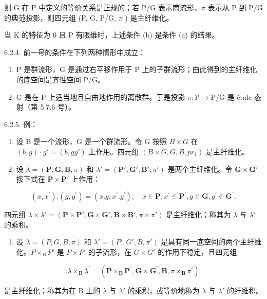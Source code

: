 则 G 在 P 中定义的等价关系是正规的；若 P/G 表示商流形，\(\pi\) 表示从 P 到 P/G 的典范投影，则四元组 (P, G, P/G, \(\pi\) ) 是主纤维化。

当 K 的特征为 0 且 P 有限维时，上述条件 (b) 是条件 (a) 的结果。

6.2.4. 前一号的条件在下列两种情形中成立：

\begin{enumerate}
\def\labelenumi{(\alph{enumi})}
\item
  P 是群流形，G 是通过右平移作用于 P 上的子群流形；由此得到的主纤维化的底空间是齐性空间 P/G。
\item
  G 是在 P 上适当地且自由地作用的离散群。于是投影 \(\pi: \mathrm{P} \to \mathrm{P} / \mathrm{G}\) 是 étale 态射（第 5.7.6 号）。
\end{enumerate}

6.2.5. 例：

\begin{enumerate}
\def\labelenumi{(\alph{enumi})}
\item
  设 B 是一个流形，G 是一个群流形。令 G 按照 \(B \times G\) 在 \((b, g) \cdot g' = (b, gg')\) 上作用。四元组 \((B \times G, G, B, pr_{1})\) 是主纤维化。
\item
  设 \(\lambda = (\mathbf{P}, \mathbf{G}, \mathbf{B}, \pi)\) 和 \(\lambda' = (\mathbf{P}', \mathbf{G}', \mathbf{B}', \pi')\) 是两个主纤维化。令 \(\mathbf{G} \times \mathbf{G}'\) 按下式在 \(\mathbf{P} \times \mathbf{P}'\) 上作用：
\end{enumerate}

\[
(x, x ^ {\prime}). (g, g ^ {\prime}) = (x. g, x ^ {\prime}. g ^ {\prime}), \quad x \in \mathbf {P}, x ^ {\prime} \in \mathbf {P} ^ {\prime}, g \in \mathbf {G}, g ^ {\prime} \in \mathbf {G} ^ {\prime}.
\]

四元组 \(\lambda \times \lambda' = (\mathbf{P} \times \mathbf{P}', \mathbf{G} \times \mathbf{G}', \mathbf{B} \times \mathbf{B}', \pi \times \pi')\) 是主纤维化；称其为 \(\lambda\) 与 \(\lambda'\) 的乘积。

\begin{enumerate}
\def\labelenumi{(\alph{enumi})}
\setcounter{enumi}{2}
\tightlist
\item
  设 \(\lambda = (P, G, B, \pi)\) 和 \(\lambda' = (P', G', B, \pi')\) 是具有同一底空间的两个主纤维化。\(P \times_{B} P'\) 是 \(P \times P'\) 的子流形，在 \(G \times G'\) 的作用下稳定，且四元组
\end{enumerate}

\[
\lambda \times_ {\mathbf {B}} \lambda^ {\prime} = (\mathbf {P} \times_ {\mathbf {B}} \mathbf {P} ^ {\prime}, \mathbf {G} \times \mathbf {G} ^ {\prime}, \mathbf {B}, \pi \times_ {\mathbf {B}} \pi^ {\prime})
\]

是主纤维化；称其为在 B 上的 \(\lambda\) 与 \(\lambda'\) 的乘积，或等价地称为 \(\lambda\) 与 \(\lambda'\) 的纤维积。

